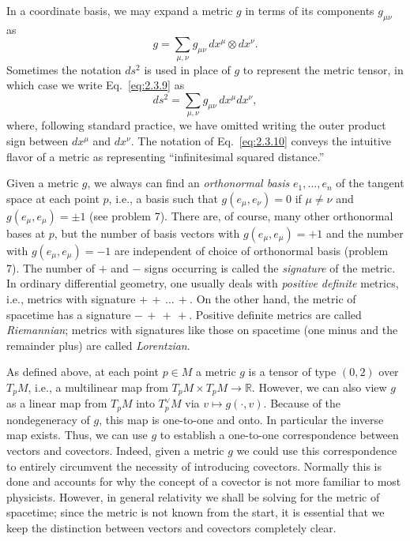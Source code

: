 In a coordinate basis, we may expand a metric \(g\) in terms of its components
\(g_{\mu\nu}\) as
\begin{equation}
  g=\sum_{\mu,\nu}g_{\mu\nu}\,dx^\mu\otimes dx^\nu .
  \tag{2.3.9}\label{eq:2.3.9}
\end{equation}
Sometimes the notation \(ds^2\) is used in place of \(g\) to represent the metric
tensor, in which case we write Eq.~\eqref{eq:2.3.9} as
\begin{equation}
  ds^2=\sum_{\mu,\nu}g_{\mu\nu}\,dx^\mu dx^\nu ,
  \tag{2.3.10}\label{eq:2.3.10}
\end{equation}
where, following standard practice, we have omitted writing the outer product sign
between \(dx^\mu\) and \(dx^\nu\).  The notation of Eq.~\eqref{eq:2.3.10}
conveys the intuitive flavor of a metric as representing ``infinitesimal squared
distance.''

Given a metric \(g\), we always can find an \emph{orthonormal basis}
\(e_1,\ldots,e_n\) of the tangent space at each point \(p\), i.e., a basis such that
\(g(e_\mu,e_\nu)=0\) if \(\mu\ne\nu\) and \(g(e_\mu,e_\mu)=\pm1\) (see problem
7).  There are, of course, many other orthonormal bases at \(p\), but the number of
basis vectors with \(g(e_\mu,e_\mu)=+1\) and the number with
\(g(e_\mu,e_\mu)=-1\) are independent of choice of orthonormal basis (problem 7).
The number of \(+\) and \(-\) signs occurring is called the \emph{signature} of the
metric.  In ordinary differential geometry, one usually deals with \emph{positive
definite} metrics, i.e., metrics with signature \(+\,+\,\ldots\,+\).  On the other
hand, the metric of spacetime has a signature \(-\,+\,+\,+\).  Positive definite
metrics are called \emph{Riemannian}; metrics with signatures like those on
spacetime (one minus and the remainder plus) are called \emph{Lorentzian}.

As defined above, at each point \(p\in M\) a metric \(g\) is a tensor of type
\((0,2)\) over \(T_pM\), i.e., a multilinear map from
\(T_pM\times T_pM\to\mathbb{R}\).  However, we can also view \(g\) as a linear
map from \(T_pM\) into \(T_p^\vee M\) via \(v\mapsto g(\mathord\cdot,v)\).  Because
of the nondegeneracy of \(g\), this map is one-to-one and onto.  In particular the
inverse map exists.  Thus, we can use \(g\) to establish a one-to-one correspondence
between vectors and covectors.  Indeed, given a metric \(g\) we could use this
correspondence to entirely circumvent the necessity of introducing covectors.
Normally this is done and accounts for why the concept of a covector is not more
familiar to most physicists.  However, in general relativity we shall be solving for
the metric of spacetime; since the metric is not known from the start, it is essential
that we keep the distinction between vectors and covectors completely clear.
